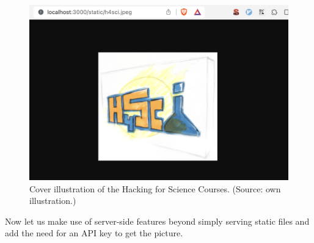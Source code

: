 \documentclass[
  12pt,
  letterpaper,
]{krantz}
\begin{document}
\begin{figure}

{\centering \includegraphics{./images/h4sci.png}

}

\caption{Cover illustration of the Hacking for Science Courses. (Source:
own illustration.)}

\end{figure}

Now let us make use of server-side features beyond simply serving static
files and add the need for an API key to get the picture.
\end{document}

